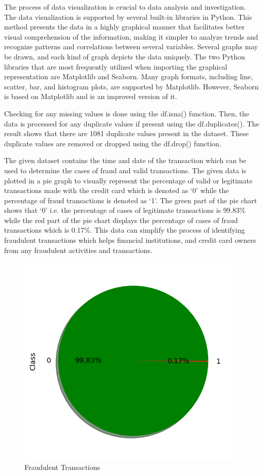 The process of data visualization is crucial to data analysis and investigation. The data visualization is supported by several built-in libraries in Python. This method presents the data in a highly graphical manner that facilitates better visual comprehension of the information, making it simpler to analyze trends and recognize patterns and correlations between several variables. Several graphs may be drawn, and each kind of graph depicts the data uniquely. The two Python libraries that are most frequently utilized when importing the graphical representation are Matplotlib and Seaborn. Many graph formats, including line, scatter, bar, and histogram plots, are supported by Matplotlib. However, Seaborn is based on Matplotlib and is an improved version of it. 

Checking for any missing values is done using the df.isna() function. Then, the data is processed for any duplicate values if present using the df.duplicates(). The result shows that there are 1081 duplicate values present in the dataset. These duplicate values are removed or dropped using the df.drop() function.

The given dataset contains the time and date of the transaction which can be used to determine the cases of fraud and valid transactions. The given data is plotted in a pie graph to visually represent the percentage of valid or legitimate transactions made with the credit card which is denoted as ‘0’ while the percentage of fraud transactions is denoted as ‘1’. The green part of the pie chart shows that ‘0’ i.e. the percentage of cases of legitimate transactions is 99.83\% while the red part of the pie chart displays the percentage of cases of fraud transactions which is 0.17\%. This data can simplify the process of identifying fraudulent transactions which helps financial institutions, and credit card owners from any fraudulent activities and transactions.


\begin{figure}[ht]
    \centering
    \includegraphics[scale=1]{figures/Preprocessing.png}
    \caption{Fraudulent Transactions}
    \label{fig:Data Preprocessing}
\end{figure}


